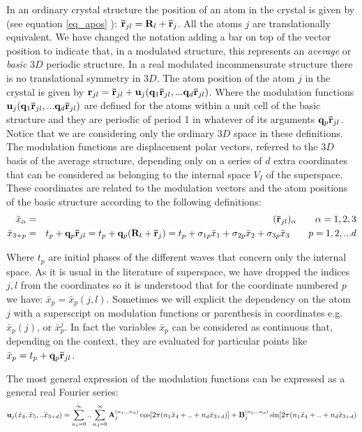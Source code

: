 \documentclass[10pt]{article}
\begin{document}
In an ordinary crystal structure the position of an atom in the crystal is given by (see equation \ref{eq_apos} ): ${\bf \bar{r}}_{jl}= {\bf R}_l + {\bf \bar r}_{j}$. All the atoms $j$ are translationally equivalent. We have changed the notation adding a bar on top of the vector position to indicate that, in a modulated structure, this represents an {\it average} or {\it basic} $3D$ periodic structure. In a real modulated incommensurate structure there is no translational symmetry in $3D$. The atom position of the atom $j$ in the crystal is given by  ${\bf r}_{jl} = {\bf \bar{r}}_{jl}+ {\bf u}_j({\bf q}_1{\bf \bar{r}}_{jl},...{\bf q}_d{\bf \bar{r}}_{jl})$. Where the modulation functions ${\bf u}_j({\bf q}_1{\bf \bar{r}}_{jl},...{\bf q}_d{\bf \bar{r}}_{jl})$ are defined for the atoms within a unit cell of the basic structure and they are periodic of period 1 in whatever of its arguments ${\bf q}_p{\bf \bar{r}}_{jl}$. Notice that we are considering only the ordinary $3D$ space in these definitions. 
The modulation functions are displacement polar vectors, referred to the $3D$ basis of the average structure, depending only on a series of $d$ extra coordinates that can be considered as belonging to the internal space $V_I$ of the superspace. These coordinates are related to the modulation vectors and the atom positions of the basic structure according to the following definitions:
\begin{eqnarray}
\bar{x}_\alpha &=& ({\bf \bar{r}}_{jl})_\alpha  \qquad \alpha=1,2,3 \\
\label{discr_var}
\bar{x}_{3+p}&=&t_p+{\bf q}_p {\bf \bar{r}}_{jl} = t_p+{\bf q}_p ({\bf R}_l + {\bf \bar r}_{j})=t_p+\sigma_{1p}\bar{x}_1+\sigma_{2p}\bar{x}_2+\sigma_{3p}\bar{x}_3  \qquad p=1,2,...d
\end{eqnarray}

Where $t_p$ are initial phases of the different waves that concern only the internal space. As it is usual in the literature of superspace, we have dropped the indices $j,l$ from the coordinates so it is understood that for the coordinate numbered $p$ we have: $\bar{x}_p = \bar{x}_p(j,l)$. Sometimes we will explicit the dependency on the atom $j$ with a superscript on modulation functions or parenthesis in coordinates e.g. $\bar{x}_p(j)$, or  $\bar{x}_p^{j}$. In fact the variables $\bar{x}_p$ can be considered as continuous that, depending on the context, they are evaluated for particular points like $\bar{x}_p= t_p+{\bf q}_p{\bf \bar{r}}_{jl}$. 

The most general expression of the modulation functions can be expressed as a general real Fourier series:
\begin{equation} \label{umod_funct}
{\bf u}_j(\bar{x}_4,\bar{x}_5,..\bar{x}_{3+d}) =\sum\limits_{n_1=0}^{\infty}..\sum\limits_{n_d=0}^{\infty} {\bf A}_j^{(n_1,..n_d)} \cos[2\pi(n_1\bar{x}_4+..+ n_d\bar{x}_{3+d})] + {\bf B}_j^{(n_1,..n_d)} \sin[2\pi(n_1\bar{x}_4+..+ n_d\bar{x}_{3+d})
\end{equation}
\end{document}
